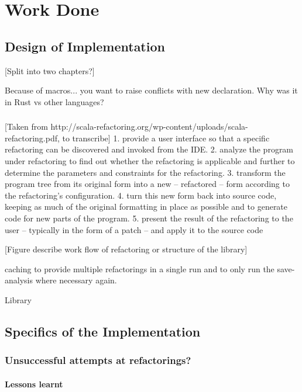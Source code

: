 \chapter{Work Done}\label{C:wd}

\section{Design of Implementation}




[Split into two chapters?]

Because of macros... you want to raise conflicts with new declaration.
Why was it in Rust vs other languages? 

\subsection{}
[Taken from http://scala-refactoring.org/wp-content/uploads/scala-refactoring.pdf, to transcribe]
1. provide a user interface so that a specific refactoring can be discovered and
invoked from the IDE.
2. analyze the program under refactoring to find out whether the refactoring is
applicable  and  further  to  determine  the  parameters  and  constraints  for  the
refactoring.
3. transform the program tree from its original form into a new – refactored – form
according to the refactoring’s configuration.
4. turn this new form back into source code,  keeping as much of the original
formatting in place as possible and to generate code for new parts of the program.
5. present the result of the refactoring to the user – typically in the form of a patch –
and apply it to the source code

[Figure describe work flow of refactoring or structure of the library]

caching to provide multiple refactorings in a single run and to only run the save-analysis where necessary again. 

Library 
\subsection{}

\subsection{}

\section{Specifics of the Implementation}
\subsection{}
\subsection{Unsuccessful attempts at refactorings?}
\subsubsection{Lessons learnt}